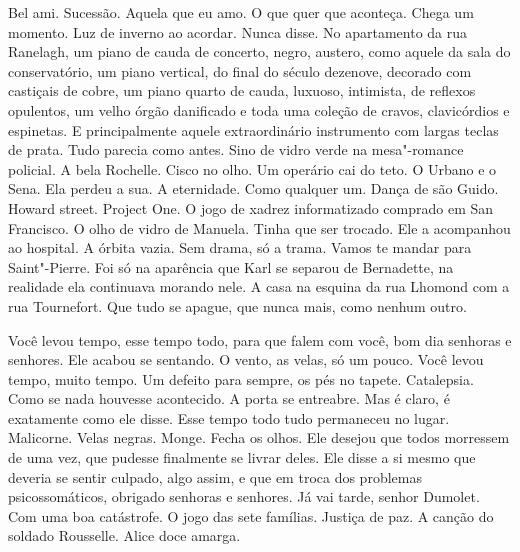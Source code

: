 Bel ami. Sucessão. Aquela que eu amo. O que quer que aconteça. Chega um
momento. Luz de inverno ao acordar. Nunca disse. No apartamento da rua
Ranelagh, um piano de cauda de concerto, negro, austero, como aquele da
sala do conservatório, um piano vertical, do final do século dezenove,
decorado com castiçais de cobre, um piano quarto de cauda, luxuoso,
intimista, de reflexos opulentos, um velho órgão danificado e toda uma
coleção de cravos, clavicórdios e espinetas. E principalmente aquele
extraordinário instrumento com largas teclas de prata. Tudo parecia como
antes. Sino de vidro verde na mesa"-romance policial. A bela Rochelle.
Cisco no olho. Um operário cai do teto. O Urbano e o Sena. Ela perdeu a
sua. A eternidade. Como qualquer um. Dança de são Guido. Howard street.
Project One. O jogo de xadrez informatizado comprado em San Francisco. O
olho de vidro de Manuela. Tinha que ser trocado. Ele a acompanhou ao
hospital. A órbita vazia. Sem drama, só a trama. Vamos te mandar para
Saint"-Pierre. Foi só na aparência que Karl se separou de Bernadette, na
realidade ela continuava morando nele. A casa na esquina da rua Lhomond
com a rua Tournefort. Que tudo se apague, que nunca mais, como nenhum
outro.

Você levou tempo, esse tempo todo, para que falem com você, bom dia
senhoras e senhores. Ele acabou se sentando. O vento, as velas, só um
pouco. Você levou tempo, muito tempo. Um defeito para sempre, os pés no
tapete. Catalepsia. Como se nada houvesse acontecido. A porta se
entreabre. Mas é claro, é exatamente como ele disse. Esse tempo todo
tudo permaneceu no lugar. Malicorne. Velas negras. Monge. Fecha os
olhos. Ele desejou que todos morressem de uma vez, que pudesse
finalmente se livrar deles. Ele disse a si mesmo que deveria se sentir
culpado, algo assim, e que em troca dos problemas psicossomáticos,
obrigado senhoras e senhores. Já vai tarde, senhor Dumolet. Com uma boa
catástrofe. O jogo das sete famílias. Justiça de paz. A canção do
soldado Rousselle. Alice doce amarga.

